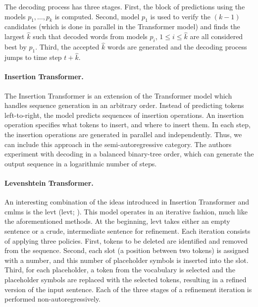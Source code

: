 The decoding process has three stages. First, the block of predictions using the
models $p_1, \ldots, p_k$ is computed. Second, model $p_1$ is used to verify the
$(k-1)$ candidates (which is done in parallel in the Transformer model) and
finds the largest $\hat{k}$ such that decoded words from models $p_i$,
$1 \leq i \leq \hat{k}$ are all considered best by $p_1$. Third, the accepted
$\hat{k}$ words are generated and the decoding process jumps to time step
$t + \hat{k}$.

\paragraph{Insertion Transformer.} The Insertion Transformer
\citep{stern-etal-2019-insertion} is an extension of the Transformer model
which handles sequence generation in an arbitrary order. Instead of predicting
tokens left-to-right, the model predicts sequences of insertion operations. An
insertion operation specifies what tokens to insert, and where to insert
them. In each step, the insertion operations are generated in parallel and
independently. Thus, we can include this approach in the semi-autoregressive
category. The authors experiment with decoding in a balanced binary-tree order,
which can generate the output sequence in a logarithmic number of steps.


\paragraph{Levenshtein Transformer.} An interesting combination of the ideas
introduced in Insertion Transformer and \acp{cmlm} is the \acl{levt}
(\acs{levt}; \citealp{gu-etal-2019-levenshtein}). This model
operates in an iterative fashion, much like the aforementioned methods. At the
beginning, \ac{levt} takes either an empty sentence or a crude, intermediate
sentence for refinement. Each iteration consists of applying three
policies. First, tokens to be deleted are identified and removed from the
sequence. Second, each slot (a position between two tokens) is assigned with a
number, and this number of placeholder symbols is inserted into the slot.
Third, for each placeholder, a token from the vocabulary is selected and the
placeholder symbols are replaced with the selected tokens, resulting in a
refined version of the input sentence.  Each of the three stages of a
refinement iteration is performed non-autoregressively.

